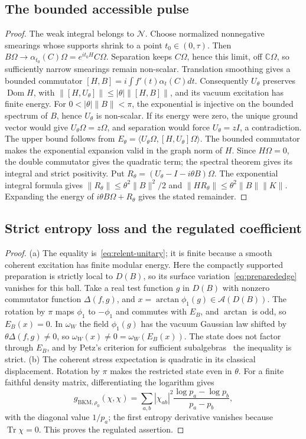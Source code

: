 \documentclass[12pt]{article}
\theoremstyle{definition}
\theoremstyle{remark}
\begin{document}
\subsection{The bounded accessible pulse}
\label{app:prop:bounded-source}
\begin{proof}
The weak integral belongs to \(\mathcal N\). Choose normalized nonnegative
smearings whose supports shrink to a point \(t_0\in(0,\tau)\). Then
\(B\Omega\to\alpha_{t_0}(C)\Omega=e^{it_0H}C\Omega\).
Separation keeps \(C\Omega\), hence this limit, off \(\mathbb C\Omega\), so
sufficiently narrow smearings remain non-scalar.
Translation smoothing gives a bounded commutator
\([H,B]=i\int f'(t)\alpha_t(C)dt\).
Consequently \(U_\theta\) preserves \(\operatorname{Dom}H\), with
\(\|[H,U_\theta]\|\le |\theta|\|[H,B]\|\), and its vacuum excitation has
finite energy. For \(0<|\theta|\|B\|<\pi\), the exponential is injective on the
bounded spectrum of \(B\), hence \(U_\theta\) is non-scalar. If its energy
were zero, the unique ground vector would give \(U_\theta\Omega=z\Omega\),
and separation would force \(U_\theta=zI\), a contradiction.
The upper bound follows from
\(E_\theta=\langle U_\theta\Omega,[H,U_\theta]\Omega\rangle\).
The bounded commutator makes the exponential expansion valid in the graph norm
of \(H\). Since \(H\Omega=0\), the double commutator gives the quadratic term;
the spectral theorem gives its integral and strict positivity. Put
\(R_\theta=(U_\theta-I-i\theta B)\Omega\).
The exponential integral formula gives
\(\|R_\theta\|\le\theta^2\|B\|^2/2\) and
\(\|HR_\theta\|\le\theta^2\|B\|\|K\|\).
Expanding the energy of \(i\theta B\Omega+R_\theta\) gives the stated remainder.
\end{proof}
\subsection{Strict entropy loss and the regulated coefficient}
\label{app:prop:entropy}
\begin{proof}
(a) The equality is~\eqref{eq:relent-unitary}; it is finite because a smooth coherent
excitation has finite modular energy. Here the compactly supported preparation is strictly
local to \(D(B)\), so its surface variation~\eqref{eq:preparededge} vanishes for this ball.
Take a real test function \(g\) in \(D(B)\) with
nonzero commutator function \(\Delta(f,g)\), and \(x=\arctan\phi_1(g)\in\mathcal A(D(B))\). The
rotation by \(\pi\) maps \(\phi_1\) to \(-\phi_1\) and commutes with \(E_B\), and \(\arctan\)
is odd, so \(E_B(x)=0\). In \(\omega_W\) the field \(\phi_1(g)\) has the vacuum Gaussian law
shifted by \(\theta\Delta(f,g)\neq0\), so \(\omega_W(x)\neq0=\omega_W(E_B(x))\). The state does
not factor through \(E_B\), and by Petz's criterion for sufficient
subalgebras~\cite{Petz1986} the inequality is strict. (b) The coherent stress expectation is quadratic in its classical displacement.
Rotation by \(\pi\) makes the restricted state even in \(\theta\).
For a finite faithful density matrix, differentiating the logarithm gives
\[
g_{\mathrm{BKM},\rho_0}(\chi,\chi)=
\sum_{a,b}|\chi_{ab}|^2
 \frac{\log p_a-\log p_b}{p_a-p_b},
\]
with the diagonal value \(1/p_a\); the first entropy derivative vanishes because
\(\operatorname{Tr}\chi=0\). This proves the regulated assertion.
\end{proof}
\end{document}
